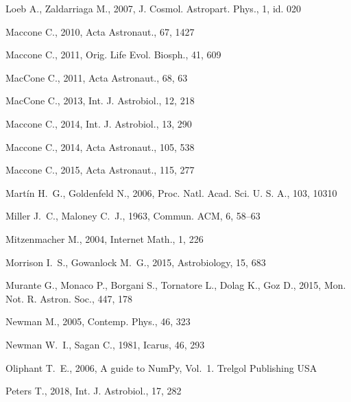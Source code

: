 \documentclass[crop]{CSLB}
\begin{document}
\begin{thebibliography}{95}
Loeb A., Zaldarriaga M., 2007, J. Cosmol. Astropart. Phys., 1, id. 020

Maccone C., 2010, Acta Astronaut., 67, 1427

Maccone C., 2011, Orig. Life Evol. Biosph., 41, 609

MacCone C., 2011, Acta Astronaut., 68, 63

MacCone C., 2013, Int. J. Astrobiol., 12, 218

Maccone C., 2014{}, Int. J. Astrobiol., 13, 290

Maccone C., 2014{}, Acta Astronaut., 105, 538

Maccone C., 2015, Acta Astronaut., 115, 277

Mart{\'{i}}n H.~G., Goldenfeld N., 2006, Proc. Natl. Acad. Sci. U. S. A., 103,
  10310

Miller J.~C., Maloney C.~J., 1963, Commun. ACM, 6, 58–63

Mitzenmacher M., 2004, Internet Math., 1, 226

Morrison I.~S., Gowanlock M.~G., 2015, Astrobiology, 15, 683

Murante G., Monaco P., Borgani S., Tornatore L., Dolag K., Goz D., 2015, Mon.
  Not. R. Astron. Soc., 447, 178

Newman M., 2005, Contemp. Phys., 46, 323

Newman W.~I., Sagan C., 1981, Icarus, 46, 293

Oliphant T.~E., 2006, A guide to NumPy, Vol.~1. Trelgol Publishing USA

Peters T., 2018, Int. J. Astrobiol., 17, 282


\end{thebibliography}
\end{document}
